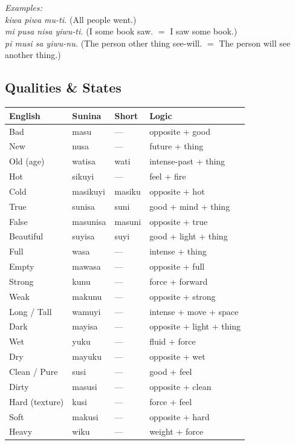 \documentclass[12pt, a4paper]{article}
\begin{document}
\vspace{0.3em}
\noindent\textit{Examples:} \\
\textit{kiwa piwa mu-ti.} \quad (All people went.) \\
\textit{mi pusa nisa yiwu-ti.} \quad (I some book saw. $=$ I saw some book.) \\
\textit{pi musi sa yiwu-nu.} \quad (The person other thing see-will. $=$ The person will see another thing.)

\subsection{Qualities \& States}
\begin{tabular}{@{}llll@{}}
\toprule
\textbf{English} & \textbf{Sunina} & \textbf{Short} & \textbf{Logic} \\ \midrule
Bad & masu & --- & opposite + good \\
New & nusa & --- & future + thing \\
Old (age) & watisa & wati & intense-past + thing \\
Hot & sikuyi & --- & feel + fire \\
Cold & masikuyi & masiku & opposite + hot \\
True & sunisa & suni & good + mind + thing \\
False & masunisa & masuni & opposite + true \\
Beautiful & suyisa & suyi & good + light + thing \\
Full & wasa & --- & intense + thing \\
Empty & mawasa & --- & opposite + full \\
Strong & kunu & --- & force + forward \\
Weak & makunu & --- & opposite + strong \\
Long / Tall & wamuyi & --- & intense + move + space \\
Dark & mayisa & --- & opposite + light + thing \\
Wet & yuku & --- & fluid + force \\
Dry & mayuku & --- & opposite + wet \\
Clean / Pure & susi & --- & good + feel \\
Dirty & masusi & --- & opposite + clean \\
Hard (texture) & kusi & --- & force + feel \\
Soft & makusi & --- & opposite + hard \\
Heavy & wiku & --- & weight + force \\

\end{tabular}
\end{document}
